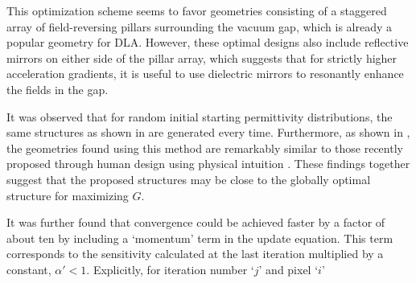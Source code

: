 
This optimization scheme seems to favor geometries consisting of a staggered array of field-reversing pillars surrounding the vacuum gap, which is already a popular geometry for DLA.
However, these optimal designs also include reflective mirrors on either side of the pillar array, which suggests that for strictly higher acceleration gradients, it is useful to use dielectric mirrors to resonantly enhance the fields in the gap.

It was observed that for random initial starting permittivity distributions, the same structures as shown in  are generated every time.
Furthermore, as shown in , the geometries found using this method are remarkably similar to those recently proposed through human design using physical intuition \cite{ACHIP_meeting3}.
These findings together suggest that the proposed structures may be close to the globally optimal structure for maximizing $G$.


It was further found that convergence could be achieved faster by a factor of about ten by including a `momentum' term in the update equation.
This term corresponds to the sensitivity calculated at the last iteration multiplied by a constant, $\alpha' < 1$. Explicitly, for iteration number `$j$' and pixel `$i$' 


